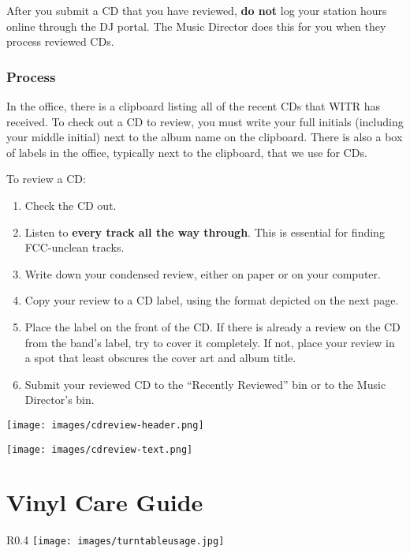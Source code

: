 \documentclass{witrman}
\begin{document}
After you submit a CD that you have reviewed, \textbf{do not} log your station
hours online through the DJ portal.  The Music Director does this for you when
they process reviewed CDs.


\subsection{Process}

In the office, there is a clipboard listing all of the recent CDs that WITR has
received.  To check out a CD to review, you must write your full initials
(including your middle initial) next to the album name on the clipboard.  There
is also a box of labels in the office, typically next to the clipboard, that we
use for CDs.

To review a CD\@:
\begin{enumerate}
    \item Check the CD out.
    \item Listen to \textbf{every track all the way through}.  This is essential
        for finding FCC-unclean tracks.
    \item Write down your condensed review, either on paper or on your computer.
    \item Copy your review to a CD label, using the format depicted on the next
        page.
    \item Place the label on the front of the CD\@.  If there is already a
        review on the CD from the band's label, try to cover it completely.  If
        not, place your review in a spot that least obscures the cover art and
        album title.
    \item Submit your reviewed CD to the ``Recently Reviewed'' bin or to the
        Music Director's bin.
\end{enumerate}

\texttt{[image: images/cdreview-header.png]}

\texttt{[image: images/cdreview-text.png]}

\pagebreak

\chapter{Vinyl Care Guide}

\begin{wrapfigure}{R}{0.4\linewidth}
    \centering
    \texttt{[image: images/turntableusage.jpg]}
\end{wrapfigure}
\end{document}
